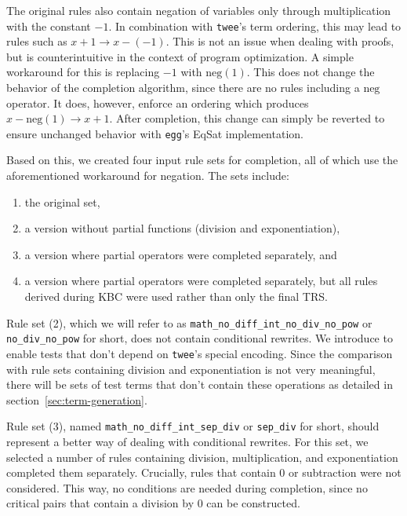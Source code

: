 The original rules also contain negation of variables only through multiplication with the constant $-1$. In combination with \texttt{twee}'s term ordering, this may lead to rules such as $x + 1 \to x - (-1)$. This is not an issue when dealing with proofs, but is counterintuitive in the context of program optimization. A simple workaround for this is replacing $-1$ with $\text{neg}(1)$. This does not change the behavior of the completion algorithm, since there are no rules including a $\text{neg}$ operator. It does, however, enforce an ordering which produces $x - \text{neg}(1) \to x + 1$. After completion, this change can simply be reverted to ensure unchanged behavior with \texttt{egg}'s EqSat implementation.

\noindent \begin{minipage}{\linewidth}
	Based on this, we created four input rule sets for completion, all of which use the aforementioned workaround for negation. The sets include:
	\begin{enumerate}
		\item the original set,
		\item a version without partial functions (division and exponentiation),
		\item a version where partial operators were completed separately, and
		\item a version where partial operators were completed separately, but all rules derived during KBC were used rather than only the final TRS.
	\end{enumerate}
\end{minipage}

Rule set (2), which we will refer to as \texttt{math\_no\_diff\_int\_no\_div\_no\_pow} or\\ \texttt{no\_div\_no\_pow} for short, does not contain conditional rewrites. We introduce to enable tests that don't depend on \texttt{twee}'s special encoding. Since the comparison with rule sets containing division and exponentiation is not very meaningful, there will be sets of test terms that don't contain these operations as detailed in section~\ref{sec:term-generation}.

Rule set (3), named \texttt{math\_no\_diff\_int\_sep\_div} or \texttt{sep\_div} for short, should represent a better way of dealing with conditional rewrites. For this set, we selected a number of rules containing division, multiplication, and exponentiation completed them separately. Crucially, rules that contain $0$ or subtraction were not considered. This way, no conditions are needed during completion, since no critical pairs that contain a division by $0$ can be constructed.

